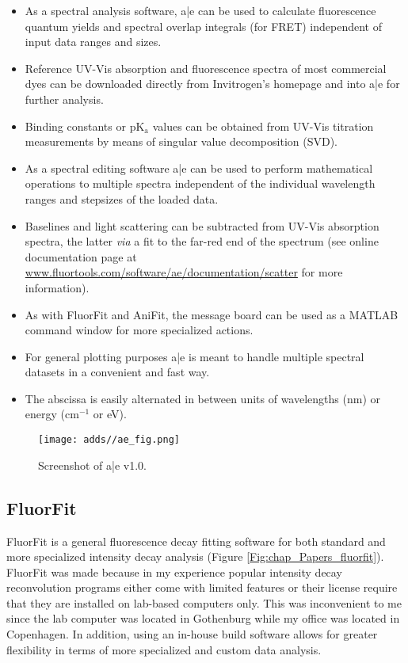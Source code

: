 \begin{itemize}
  \item As a spectral analysis software, a|e can be used to calculate fluorescence quantum yields and spectral overlap integrals (for FRET) independent of input data ranges and sizes.
  \item Reference UV-Vis absorption and fluorescence spectra of most commercial dyes can be downloaded directly from Invitrogen's homepage and into a|e for further analysis.
  \item Binding constants or pK$_\mathrm{a}$ values can be obtained from UV-Vis titration measurements by means of singular value decomposition (SVD).
  \item As a spectral editing software a|e can be used to perform mathematical operations to multiple spectra independent of the individual wavelength ranges and stepsizes of the loaded data.
  \item Baselines and light scattering can be subtracted from UV-Vis absorption spectra, the latter \emph{via} a fit to the far-red end of the spectrum (see online documentation page at \url{www.fluortools.com/software/ae/documentation/scatter} for more information).
  \item As with FluorFit and AniFit, the message board can be used as a MATLAB command window for more specialized actions.
  \item For general plotting purposes a|e is meant to handle multiple spectral datasets in a convenient and fast way.
  \item The abscissa is easily alternated in between units of wavelengths (nm) or energy (cm$^{-1}$ or eV).
\end{itemize}

\begin{figure}
    \centering
        \texttt{[image: adds//ae\_fig.png]}
    \captionsetup{width=.95\textwidth}
    \caption{Screenshot of a|e v1.0.}
    \label{Fig:chap_Papers_ae}
\end{figure}

\subsection{FluorFit}
 FluorFit is a general fluorescence decay fitting software for both standard and more specialized intensity decay analysis (Figure \ref{Fig:chap_Papers_fluorfit}). FluorFit was made because in my experience popular intensity decay reconvolution programs either come with limited features or their license require that they are installed on lab-based computers only. This was inconvenient to me since the lab computer was located in Gothenburg while my office was located in Copenhagen. In addition, using an in-house build software allows for greater flexibility in terms of more specialized and custom data analysis.

